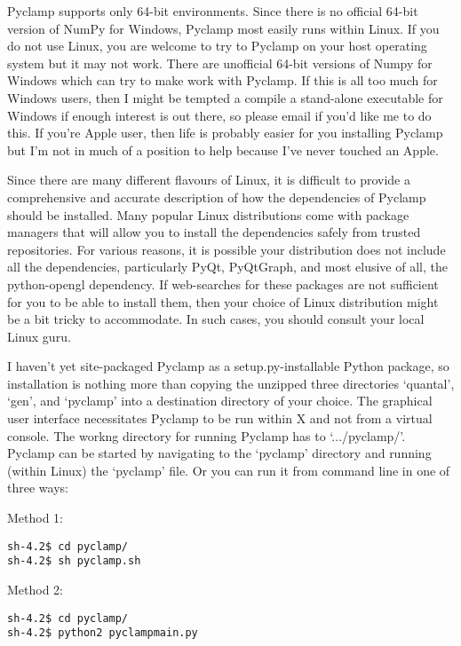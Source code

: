 \documentclass{article}
\begin{document}
Pyclamp supports only 64-bit environments. Since there is no official 64-bit version of NumPy for Windows, Pyclamp
most easily runs within Linux. If you do not use Linux, you are welcome to try to Pyclamp on your host operating system
but it may not work. There are unofficial 64-bit versions of Numpy for Windows which can try to make work with Pyclamp.
If this is all too much for Windows users, then I might be tempted a compile a stand-alone executable for Windows if
enough interest is out there, so please email if you'd like me to do this. If you're Apple user, then life is probably
easier for you installing Pyclamp but I'm not in much of a position to help because I've never touched an Apple.

Since there are many different flavours of Linux, it is difficult to provide a comprehensive and accurate description of
how the dependencies of Pyclamp should be installed. Many popular Linux distributions come with package managers that
will allow you to install the dependencies safely from trusted repositories. For various reasons, it is possible your
distribution does not include all the dependencies, particularly PyQt, PyQtGraph, and most elusive of all, the
python-opengl dependency. If web-searches for these packages are not sufficient for you to be able to install them, then
your choice of Linux distribution might be a bit tricky to accommodate. In such cases, you should consult your local
Linux guru.

I haven't yet site-packaged Pyclamp as a setup.py-installable Python package, so installation is nothing more than
copying the unzipped three directories `quantal', `gen', and `pyclamp' into a destination directory of your choice. The
graphical user interface necessitates Pyclamp to be run within X and not from a virtual console. The workng directory
for running Pyclamp has to `.../pyclamp/'. Pyclamp can be started by navigating to the `pyclamp' directory and running
(within Linux) the `pyclamp' file. Or you can run it from command line in one of three ways:

Method 1:

\begin{verbatim}
sh-4.2$ cd pyclamp/
sh-4.2$ sh pyclamp.sh
\end{verbatim}

Method 2:

\begin{verbatim}
sh-4.2$ cd pyclamp/
sh-4.2$ python2 pyclampmain.py
\end{verbatim}
\end{document}
